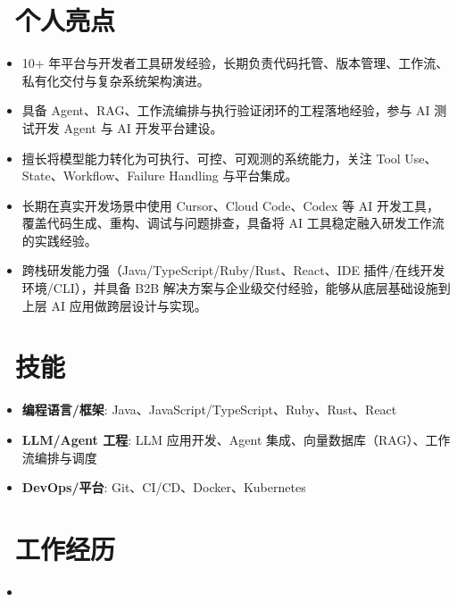 \documentclass{resume}
\begin{document}



\section{\texorpdfstring{\faStar\ 个人亮点}{个人亮点}}
\begin{itemize}[parsep=0.5ex]
  \item 10+ 年平台与开发者工具研发经验，长期负责代码托管、版本管理、工作流、私有化交付与复杂系统架构演进。
  \item 具备 Agent、RAG、工作流编排与执行验证闭环的工程落地经验，参与 AI 测试开发 Agent 与 AI 开发平台建设。
  \item 擅长将模型能力转化为可执行、可控、可观测的系统能力，关注 Tool Use、State、Workflow、Failure Handling 与平台集成。
  \item 长期在真实开发场景中使用 Cursor、Cloud Code、Codex 等 AI 开发工具，覆盖代码生成、重构、调试与问题排查，具备将 AI 工具稳定融入研发工作流的实践经验。
  \item 跨栈研发能力强（Java/TypeScript/Ruby/Rust、React、IDE 插件/在线开发环境/CLI），并具备 B2B 解决方案与企业级交付经验，能够从底层基础设施到上层 AI 应用做跨层设计与实现。
\end{itemize}

\section{\texorpdfstring{\faCogs\ 技能}{技能}}
\begin{itemize}[parsep=0.5ex]
  \item \textbf{编程语言/框架}: Java、JavaScript/TypeScript、Ruby、Rust、React
  \item \textbf{LLM/Agent 工程}: LLM 应用开发、Agent 集成、向量数据库（RAG）、工作流编排与调度
  \item \textbf{DevOps/平台}: Git、CI/CD、Docker、Kubernetes
\end{itemize}

\section{\texorpdfstring{\faBuilding\ 工作经历}{工作经历}}

\begin{itemize}
  \item {}
\end{itemize}
\end{document}
